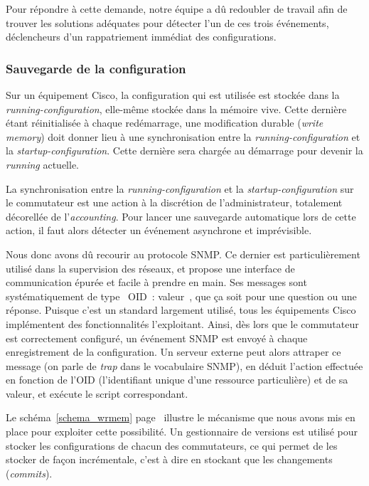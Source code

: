 Pour répondre à cette demande, notre équipe a dû redoubler de travail afin de trouver les solutions adéquates pour détecter l'un de ces trois événements, déclencheurs d'un rappatriement immédiat des configurations.

\subsubsection{Sauvegarde de la configuration}

Sur un équipement Cisco, la configuration qui est utilisée est stockée dans la \emph{running-configuration}, elle-même stockée dans la mémoire vive. Cette dernière étant réinitialisée à chaque redémarrage, une modification durable (\emph{write memory}) doit donner lieu à une synchronisation entre la \emph{running-configuration} et la \emph{startup-configuration}. Cette dernière sera chargée au démarrage pour devenir la \emph{running} actuelle. 

La synchronisation entre la \emph{running-configuration} et la \emph{startup-configuration} sur le commutateur est une action à la discrétion de l'administrateur, totalement décorellée de l'\emph{accounting}. Pour lancer une sauvegarde automatique lors de cette action, il faut alors détecter un événement asynchrone et imprévisible.

Nous donc avons dû recourir au protocole SNMP. Ce dernier est particulièrement utilisé dans la supervision des réseaux, et propose une interface de communication épurée et facile à prendre en main. Ses messages sont systématiquement de type \og~OID~: valeur~\fg, que ça soit pour une question ou une réponse. Puisque c'est un standard largement utilisé, tous les équipements Cisco implémentent des fonctionnalités l'exploitant. Ainsi, dès lors que le commutateur est correctement configuré, un événement SNMP est envoyé à chaque enregistrement de la configuration. Un serveur externe peut alors attraper ce message (on parle de \emph{trap} dans le vocabulaire SNMP), en déduit l'action effectuée en fonction de l'OID (l'identifiant unique d'une ressource particulière) et de sa valeur, et exécute le script correspondant.

Le schéma~\ref{schema_wrmem} page~\pageref{schema_wrmem} illustre le mécanisme que nous avons mis en place pour exploiter cette possibilité. Un gestionnaire de versions est utilisé pour stocker les configurations de chacun des commutateurs, ce qui permet de les stocker de façon incrémentale, c'est à dire en stockant que les changements (\emph{commits}).

